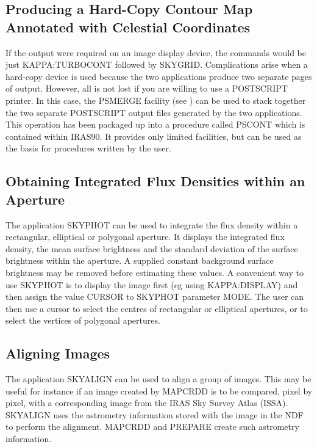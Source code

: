 \documentclass[11pt,nolof,noabs]{starlink}
\begin{document}
\subsection{Producing a Hard-Copy Contour Map Annotated with Celestial Coordinates}
\begin{sloppypar}
If the output were required on an image display device, the commands would be
just {\small KAPPA:TURBOCONT} followed by {\small SKYGRID}. Complications
arise when a hard-copy device is used because the two applications produce two
separate pages of output. However, all is not lost if you are willing to use a
{\small POSTSCRIPT} printer. In this case, the {\small PSMERGE} facility (see
) can be used to stack together the two separate {\small POSTSCRIPT}
output files generated by the two applications. This operation has been
packaged
up into a procedure called {\small PSCONT} which is contained within {\small
IRAS90}. It provides only limited facilities, but can be used as the basis for
procedures written by the user.
\end{sloppypar}

\subsection{Obtaining Integrated Flux Densities within an Aperture}
The application {\small SKYPHOT} can be used to integrate the flux density
within a rectangular, elliptical or polygonal aperture. It displays the
integrated flux density, the mean surface brightness and the standard deviation
of the surface brightness within the aperture. A supplied constant background
surface brightness may be removed before estimating these values. A convenient
way to use {\small SKYPHOT} is to display the image first (eg using {\small
KAPPA:DISPLAY}) and then assign the value {\small CURSOR} to {\small SKYPHOT}
parameter {\small MODE}. The user can then use a cursor to select the centres of
rectangular or elliptical apertures, or to select the vertices of polygonal
apertures.

\subsection{Aligning Images}
The application {\small SKYALIGN} can be used to align a group of images. This
may be useful for instance if an image created by {\small MAPCRDD} is to be
compared, pixel by pixel, with a corresponding image from the {\small IRAS} Sky
Survey Atlas ({\small ISSA}). {\small SKYALIGN} uses the astrometry information
stored with the image in the {\small NDF} to perform the alignment. {\small
MAPCRDD} and {\small PREPARE} create such astrometry information.
\end{document}
